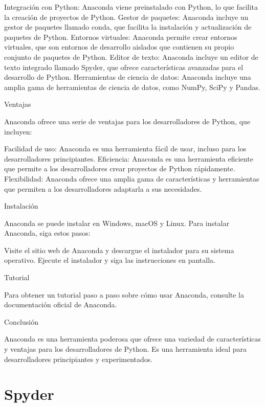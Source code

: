 Integración con Python: Anaconda viene preinstalado con Python, lo que facilita la creación de proyectos de Python.
Gestor de paquetes: Anaconda incluye un gestor de paquetes llamado conda, que facilita la instalación y actualización de paquetes de Python.
Entornos virtuales: Anaconda permite crear entornos virtuales, que son entornos de desarrollo aislados que contienen su propio conjunto de paquetes de Python.
Editor de texto: Anaconda incluye un editor de texto integrado llamado Spyder, que ofrece características avanzadas para el desarrollo de Python.
Herramientas de ciencia de datos: Anaconda incluye una amplia gama de herramientas de ciencia de datos, como NumPy, SciPy y Pandas.

Ventajas

Anaconda ofrece una serie de ventajas para los desarrolladores de Python, que incluyen:

Facilidad de uso: Anaconda es una herramienta fácil de usar, incluso para los desarrolladores principiantes.
Eficiencia: Anaconda es una herramienta eficiente que permite a los desarrolladores crear proyectos de Python rápidamente.
Flexibilidad: Anaconda ofrece una amplia gama de características y herramientas que permiten a los desarrolladores adaptarla a sus necesidades.

Instalación

Anaconda se puede instalar en Windows, macOS y Linux. Para instalar Anaconda, siga estos pasos:

Visite el sitio web de Anaconda y descargue el instalador para su sistema operativo.
Ejecute el instalador y siga las instrucciones en pantalla.

Tutorial

Para obtener un tutorial paso a paso sobre cómo usar Anaconda, consulte la documentación oficial de Anaconda.



Conclusión

Anaconda es una herramienta poderosa que ofrece una variedad de características y ventajas para los desarrolladores de Python. Es una herramienta ideal para desarrolladores principiantes y experimentados.\\









\section*{Spyder} 

